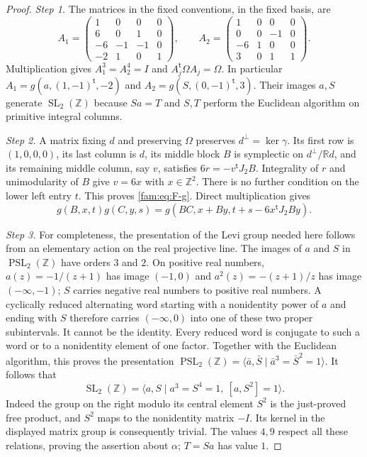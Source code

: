 \begin{proof}
\par\noindent\textit{Step 1.} The matrices in the fixed conventions, in the fixed basis, are
\[
 A_1=\begin{pmatrix}1&0&0&0\\6&0&1&0\\-6&-1&-1&0\\-2&1&0&1\end{pmatrix},
 \qquad
 A_2=\begin{pmatrix}1&0&0&0\\0&0&-1&0\\-6&1&0&0\\3&0&1&1\end{pmatrix}.
\]
Multiplication gives $A_1^3=A_2^4=I$ and
$A_j^{\mathsf t}\Omega A_j=\Omega$.  In particular
$A_1=g(a,(1,-1)^{\mathsf t},-2)$ and
$A_2=g(S,(0,-1)^{\mathsf t},3)$.  Their images $a,S$ generate
$\operatorname{SL}_2(\mathbb Z)$ because $Sa=T$ and $S,T$ perform the
Euclidean algorithm on primitive integral columns.

\par\noindent\textit{Step 2.} A matrix fixing $d$ and preserving $\Omega$ preserves
$d^{\perp}=\ker\gamma$.  Its first row is $(1,0,0,0)$, its last column is
$d$, its middle block $B$ is symplectic on
$d^{\perp}/\mathbb Rd$, and its remaining middle column, say $v$, satisfies
$6r=-v^{\mathsf t}J_2B$.  Integrality of $r$ and unimodularity of $B$
give $v=6x$ with $x\in\mathbb Z^2$.  There is no further condition on
the lower left entry $t$.  This proves \eqref{fam:eq:F-g}.  Direct multiplication
gives
\begin{equation}\label{fam:eq:F-law}
 g(B,x,t)g(C,y,s)
 =g(BC,x+By,t+s-6x^{\mathsf t}J_2By).
\end{equation}

\par\noindent\textit{Step 3.} For completeness, the presentation of the Levi group needed here follows
from an elementary action on the real projective line.  The images of $a$
and $S$ in $\operatorname{PSL}_2(\mathbb Z)$ have orders $3$ and $2$.
On positive real numbers, $a(z)=-1/(z+1)$ has image $(-1,0)$ and
$a^2(z)=-(z+1)/z$ has image $(-\infty,-1)$; $S$ carries negative real
numbers to positive real numbers.  A cyclically reduced alternating word
starting with a nonidentity power of $a$ and ending with $S$ therefore
carries $(-\infty,0)$ into one of these two proper subintervals.  It cannot
be the identity.  Every reduced word is conjugate to such a word or to a
nonidentity element of one factor.  Together with the Euclidean algorithm,
this proves the presentation
$\operatorname{PSL}_2(\mathbb Z)=\langle\bar a,\bar S\mid
\bar a^3=\bar S^2=1\rangle$.  It follows that
\begin{equation}\label{fam:eq:F-SLpresentation}
 \operatorname{SL}_2(\mathbb Z)=
 \langle a,S\mid a^3=S^4=1,\ [a,S^2]=1\rangle.
\end{equation}
Indeed the group on the right modulo its central element $S^2$ is the
just-proved free product, and $S^2$ maps to the nonidentity matrix $-I$.
Its kernel in the displayed matrix group is consequently trivial.
The values $4,9$ respect all these relations, proving the assertion about
$\alpha$; $T=Sa$ has value $1$.


\end{proof}
